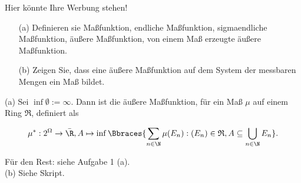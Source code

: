 \begin{exercise}

Hier könnte Ihre Werbung stehen!

\begin{itemize}
  \item[(a)] Definieren sie Maßfunktion, endliche Maßfunktion, sigmaendliche Maßfunktion, äußere Maßfunktion, von einem Maß erzeugte äußere Maßfunktion.
  \item[(b)] Zeigen Sie, dass eine äußere Maßfunktion auf dem System der messbaren Mengen ein Maß bildet.
\end{itemize}

\end{exercise}


\begin{solution}

(a) Sei $\inf \emptyset := \infty$. Dann ist die äußere Maßfunktion, für ein Maß $\mu$ auf einem Ring $\mathfrak{R}$, definiert als

\begin{align*}
  \mu^\ast:
  2^\Omega \to \bar \R,
  A \mapsto \inf \Bbraces{\sum_{n \in \N} \mu(E_n): (E_n) \in \mathfrak{R}, A \subseteq \bigcup_{n \in \N} E_n}.
\end{align*}

Für den Rest: siehe Aufgabe 1 (a). \\

(b) Siehe Skript.

\end{solution}
